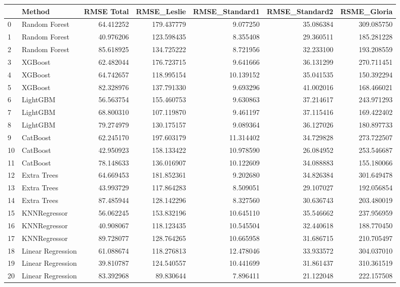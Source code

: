 \begin{tabular}{llrrrrr}
\toprule
{} &             Method &  RMSE Total &  RMSE\_Leslie &  RMSE\_Standard1 &  RMSE\_Standard2 &  RSME\_Gloria \\
\midrule
0  &      Random Forest &   64.412252 &   179.437779 &        9.077250 &       35.086384 &   309.085750 \\
1  &      Random Forest &   40.976206 &   123.598435 &        8.355408 &       29.360511 &   185.281228 \\
2  &      Random Forest &   85.618925 &   134.725222 &        8.721956 &       32.233100 &   193.208559 \\
3  &            XGBoost &   62.482044 &   176.723715 &        9.641666 &       36.131299 &   270.711451 \\
4  &            XGBoost &   64.742657 &   118.995154 &       10.139152 &       35.041535 &   150.392294 \\
5  &            XGBoost &   82.328976 &   137.791330 &        9.693296 &       41.002016 &   168.466021 \\
6  &           LightGBM &   56.563754 &   155.460753 &        9.630863 &       37.214617 &   243.971293 \\
7  &           LightGBM &   68.800310 &   107.119870 &        9.461197 &       37.115416 &   169.422402 \\
8  &           LightGBM &   79.274979 &   130.175157 &        9.089364 &       36.127026 &   180.897733 \\
9  &           CatBoost &   62.245170 &   197.603179 &       11.314402 &       34.729828 &   273.722507 \\
10 &           CatBoost &   42.950923 &   158.133422 &       10.978590 &       26.084952 &   253.546687 \\
11 &           CatBoost &   78.148633 &   136.016907 &       10.122609 &       34.088883 &   155.180066 \\
12 &        Extra Trees &   64.669453 &   181.852361 &        9.202680 &       34.826384 &   301.649478 \\
13 &        Extra Trees &   43.993729 &   117.864283 &        8.509051 &       29.107027 &   192.056854 \\
14 &        Extra Trees &   87.485944 &   128.142296 &        8.327560 &       30.636743 &   203.480019 \\
15 &       KNNRegressor &   56.062245 &   153.832196 &       10.645110 &       35.546662 &   237.956959 \\
16 &       KNNRegressor &   40.908067 &   118.123435 &       10.545504 &       32.440618 &   188.770450 \\
17 &       KNNRegressor &   89.728077 &   128.764265 &       10.665958 &       31.686715 &   210.705497 \\
18 &  Linear Regression &   61.088674 &   118.276813 &       12.478046 &       33.933572 &   304.037010 \\
19 &  Linear Regression &   39.810787 &   124.540557 &       10.441699 &       31.861437 &   310.361519 \\
20 &  Linear Regression &   83.392968 &    89.830644 &        7.896411 &       21.122048 &   222.157508 \\
\bottomrule
\end{tabular}
